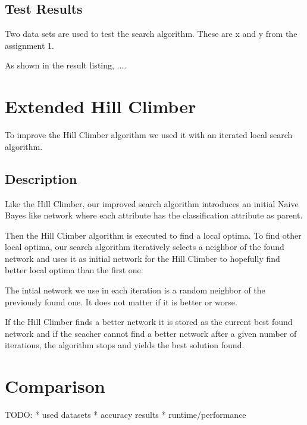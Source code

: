 \documentclass[paper=a4, fontsize=11pt]{scrartcl} %
\numberwithin{equation}{section} %
\numberwithin{figure}{section} %
\numberwithin{table}{section} %
\begin{document}
%
%
\subsection{Test Results}

Two data sets are used to test the search algorithm. These are x and y from the assignment 1.


As shown in the result listing,  ....

%
%
%
\section{Extended Hill Climber}

To improve the Hill Climber algorithm we used it with an iterated local search algorithm.

\subsection{Description}

Like the Hill Climber, our improved search algorithm introduces an initial Naive Bayes like network where each attribute has the classification attribute as parent.

Then the Hill Climber algorithm is executed to find a local optima. To find other local optima, our search algorithm iteratively selects a neighbor of the found network and uses it as initial network for the Hill Climber to hopefully find better local optima than the first one.

 The intial network we use in each iteration is a random neighbor of the previously found one. It does not matter if it is better or worse.

If the Hill Climber finds a better network it is stored as the current best found network and if the seacher cannot find a better network after a given number of iterations, the algorithm stops and yields the best solution found.



%
%
%
\section{Comparison}

TODO:
* used datasets
* accuracy results
* runtime/performance



\end{document}
